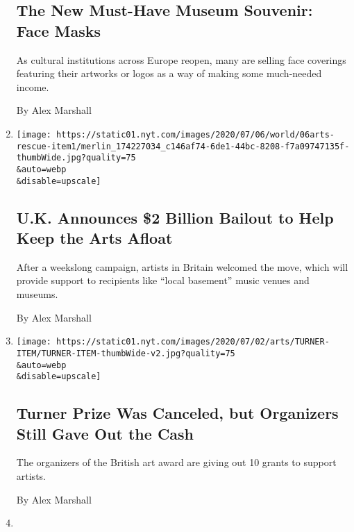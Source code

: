 \begin{enumerate}
  \hypertarget{the-new-must-have-museum-souvenir-face-masks}{%
  \subsection{The New Must-Have Museum Souvenir: Face
  Masks}\label{the-new-must-have-museum-souvenir-face-masks}}

  As cultural institutions across Europe reopen, many are selling face
  coverings featuring their artworks or logos as a way of making some
  much-needed income.

  By Alex Marshall
\item
  \href{/2020/07/06/arts/uk-rescue-package.html}{}

  \texttt{[image: https://static01.nyt.com/images/2020/07/06/world/06arts-rescue-item1/merlin\_174227034\_c146af74-6de1-44bc-8208-f7a09747135f-thumbWide.jpg?quality=75\\\&auto=webp\\\&disable=upscale]}

  \hypertarget{uk-announces-2-billion-bailout-to-help-keep-the-arts-afloat}{%
  \subsection{U.K. Announces \$2 Billion Bailout to Help Keep the Arts
  Afloat}\label{uk-announces-2-billion-bailout-to-help-keep-the-arts-afloat}}

  After a weekslong campaign, artists in Britain welcomed the move,
  which will provide support to recipients like ``local basement'' music
  venues and museums.

  By Alex Marshall
\item
  \href{/2020/07/02/arts/design/turner-prize-coronavirus-bursaries.html}{}

  \texttt{[image: https://static01.nyt.com/images/2020/07/02/arts/TURNER-ITEM/TURNER-ITEM-thumbWide-v2.jpg?quality=75\\\&auto=webp\\\&disable=upscale]}

  \hypertarget{turner-prize-was-canceled-but-organizers-still-gave-out-the-cash}{%
  \subsection{Turner Prize Was Canceled, but Organizers Still Gave Out
  the
  Cash}\label{turner-prize-was-canceled-but-organizers-still-gave-out-the-cash}}

  The organizers of the British art award are giving out 10 grants to
  support artists.

  By Alex Marshall
\item
  \href{/2020/07/01/theater/britain-arts-future-coronavirus.html}{}


\end{enumerate}
